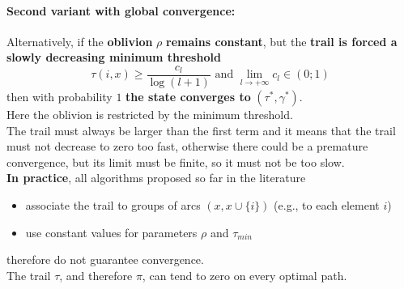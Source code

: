 \newpage

\paragraph{Second variant with global convergence:} Alternatively, if the \textbf{oblivion} $\rho$ \textbf{remains constant}, but the \textbf{trail is forced a slowly decreasing minimum threshold}
$$ \tau (i,x) \geq \frac{c_l}{\log(l+1)} \text{ and } \lim_{l \rightarrow + \infty} c_l \in (0;1)$$
then with probability $1$ \textbf{the state converges to} $(\tau^\ast, \gamma^\ast)$.\\

Here the oblivion is restricted by the minimum threshold.\\

The trail must always be larger than the first term and it means that the trail must not decrease to zero too fast, otherwise there could be a premature convergence, but its limit must be finite, so it must not be too slow.\\ 


\textbf{In practice}, all algorithms proposed so far in the literature
\begin{itemize}
	\item associate the trail to groups of arcs $(x, x \cup \{i\})$ (e.g., to each element $i$)
	
	\item use constant values for parameters $\rho$ and $\tau_{min}$
\end{itemize}
therefore do not guarantee convergence.\\

The trail $\tau$, and therefore $\pi$, can tend to zero on every optimal path.\\


\newpage